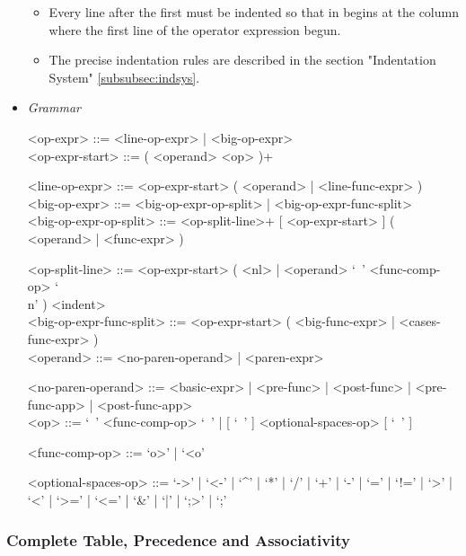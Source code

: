 \documentclass{article}
\begin{document}
\begin{itemize}
\begin{itemize}
\item
Every line after the first must be indented so that in begins at the column 
where the first line of the operator expression begun.

\item
The precise indentation rules are described in the section
"Indentation System" \ref{subsubsec:indsys}.
\end{itemize}

\item \textit{Grammar}
\begin{grammar}
<op-expr> ::= <line-op-expr> | <big-op-expr>
\\

<op-expr-start> ::= ( <operand> <op> )+

<line-op-expr> ::= <op-expr-start> ( <operand> | <line-func-expr> )
\\

<big-op-expr> ::= 
<big-op-expr-op-split> | <big-op-expr-func-split>
\\

<big-op-expr-op-split> ::= 
<op-split-line>+ [ <op-expr-start> ] ( <operand> | <func-expr> )

<op-split-line> ::=
<op-expr-start> ( <nl> | <operand> `\ ' <func-comp-op> `\\n' ) <indent> 
\\

<big-op-expr-func-split> ::= <op-expr-start> ( <big-func-expr> | <cases-func-expr> )
\\

<operand> ::= <no-paren-operand> | <paren-expr>

<no-paren-operand> ::=
<basic-expr> | <pre-func> | <post-func> | <pre-func-app> | <post-func-app>
\\

<op> ::= `\ ' <func-comp-op> `\ ' | [ `\ ' ] <optional-spaces-op> [ `\ ' ]

<func-comp-op> ::= `o>' | `<o'

<optional-spaces-op> ::= 
`->' | `<-' | `^' | `*' | `/' | `+' | `-' | `=' | `!=' | `>' | `<' | `>=' | `<=' |
`\&' | `|' | `;>' | `;'
\end{grammar}
\end{itemize}

\newpage
\subsubsection{Complete Table, Precedence and Associativity}
\end{document}
